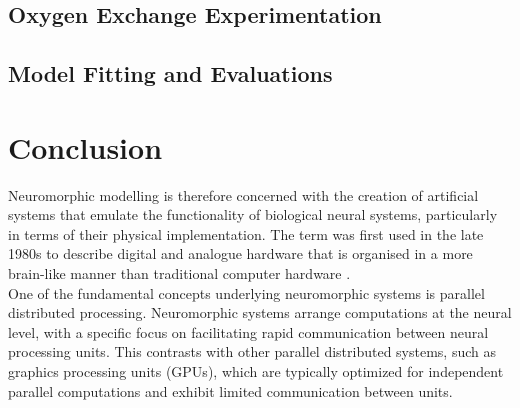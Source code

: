 \subsection[Oxygen Exchange Experimentation]{Oxygen Exchange Experimentation}

\subsection[Model Fitting and Evaluations]{Model Fitting and Evaluations}


\section[Conclusion]{Conclusion}


\noindent Neuromorphic modelling is therefore concerned with the creation of artificial systems that emulate the functionality of biological neural systems, particularly in terms of their physical implementation. The term was first used in the late 1980s to describe digital and analogue hardware that is organised in a more brain-like manner than traditional computer hardware \cite{mead1990neuromorphic}. \\

\noindent One of the fundamental concepts underlying neuromorphic systems is parallel distributed processing. Neuromorphic systems arrange computations at the neural level, with a specific focus on facilitating rapid communication between neural processing units. This contrasts with other parallel distributed systems, such as graphics processing units (GPUs), which are typically optimized for independent parallel computations and exhibit limited communication between units.
